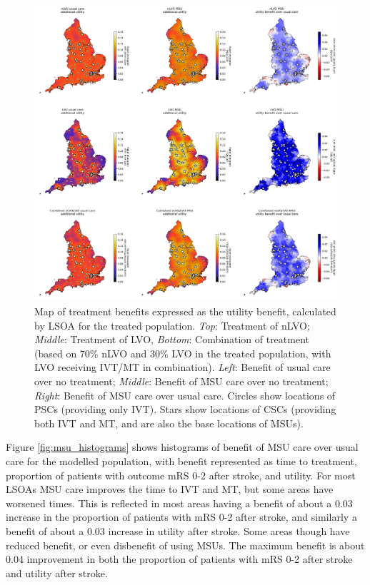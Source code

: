 \begin{figure}[h!]
    \centering
    \includegraphics[width=1\linewidth]{images/map_utility.jpg}
    \caption{Map of treatment benefits expressed as the  utility benefit, calculated by LSOA for the treated population. \textit{Top}: Treatment of nLVO; \textit{Middle}: Treatment of LVO, \textit{Bottom}: Combination of treatment (based on 70\% nLVO and 30\% LVO in the treated population, with LVO receiving IVT/MT in combination). \textit{Left}: Benefit of usual care over no treatment; \textit{Middle}: Benefit of MSU care over no treatment; \textit{Right}: Benefit of MSU care over usual care. Circles show locations of PSCs (providing only IVT). Stars show locations of CSCs (providing both IVT and MT, and are also the base locations of MSUs).}
    \label{fig:msu_map_utility}
\end{figure}


Figure \ref{fig:msu_histograms} shows histograms of benefit of MSU care over usual care for the modelled population, with benefit represented as time to treatment, proportion of patients with outcome mRS 0-2 after stroke, and utility. For most LSOAs MSU care improves the time to IVT and MT, but some areas have worsened times. This is reflected in most areas having a benefit of about a 0.03 increase in the proportion of patients with mRS 0-2 after stroke, and similarly a benefit of about a 0.03 increase in utility after stroke. Some areas though have reduced benefit, or even disbenefit of using MSUs. The maximum benefit is about 0.04 improvement in both the proportion of patients with mRS 0-2 after stroke and utility after stroke.

